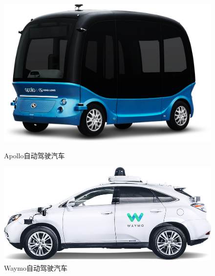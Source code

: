 \begin{figure}[!t]
	\centering
	\begin{minipage}[t]{0.40\textwidth}
		\centering
		\includegraphics[width=\textwidth]{./imgs/apollo.png}
		\caption{Apollo自动驾驶汽车}
		\label{fig:apollo}
	\end{minipage}
	\begin{minipage}[t]{0.55\textwidth}
		\centering
		\includegraphics[width=\textwidth]{./imgs/waymo.jpg}
		\caption{Waymo自动驾驶汽车}
		\label{fig:waymo}
	\end{minipage}
\end{figure}
